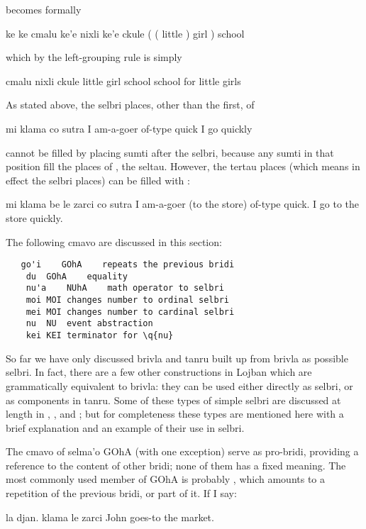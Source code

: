 {\noindent}becomes formally
\begin{example}
ke ke cmalu ke'e nixli ke'e ckule\n
( ( little ) girl ) school
\end{example}

{\noindent}which by the left-grouping rule is simply
\begin{example}
cmalu nixli ckule\n
little girl school\n
school for little girls
\end{example}

As stated above, the selbri places, other than the first,
    of
\begin{example}
mi klama co sutra\n
I am-a-goer of-type quick\n
I go quickly
\end{example}

{\noindent}cannot be filled by placing sumti after the selbri, because any
    sumti in that position fill the places of , the
    seltau. However, the tertau places (which means in effect the
    selbri places) can be filled with :
\begin{example}
mi klama be le zarci co sutra\n
I am-a-goer (to the store) of-type quick.\n
I go to the store quickly.
\end{example}



The following cmavo are discussed in this section:
\begin{verbatim}
   go'i    GOhA    repeats the previous bridi
    du  GOhA    equality
    nu'a    NUhA    math operator to selbri
    moi MOI changes number to ordinal selbri
    mei MOI changes number to cardinal selbri
    nu  NU  event abstraction
    kei KEI terminator for \q{nu}
\end{verbatim}
    So far we have only discussed brivla and tanru built up from
    brivla as possible selbri. In fact, there are a few other
    constructions in Lojban which are grammatically equivalent to
    brivla: they can be used either directly as selbri, or as
    components in tanru. Some of these types of simple selbri are
    discussed at length in , , and ; but for completeness these
    types are mentioned here with a brief explanation and an
    example of their use in selbri. 

The cmavo of selma'o GOhA (with one exception) serve as
    pro-bridi, providing a reference to the content of other bridi;
    none of them has a fixed meaning. The most commonly used member
    of GOhA is probably , which amounts to a repetition of
    the previous bridi, or part of it. If I say:
\begin{example}
la djan. klama le zarci\n
John goes-to the market.
\end{example}

